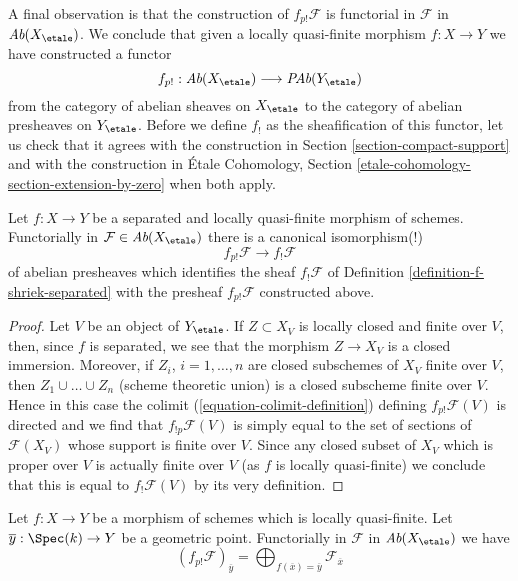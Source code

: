 \medskip\noindent
A final observation is that the construction of $f_{p!}\mathcal{F}$
is functorial in $\mathcal{F}$ in $\textit{Ab}(X_\etale)$.
We conclude that given a locally quasi-finite morphism $f : X \to Y$
we have constructed a functor
$$
f_{p!} :
\textit{Ab}(X_\etale)
\longrightarrow
\textit{PAb}(Y_\etale)
$$
from the category of abelian sheaves on $X_\etale$ to the category
of abelian presheaves on $Y_\etale$. Before we define $f_!$ as the
sheafification of this functor, let us check that it agrees with
the construction in Section \ref{section-compact-support}
and with the construction in
\'Etale Cohomology, Section \ref{etale-cohomology-section-extension-by-zero}
when both apply.

\begin{lemma}
\label{lemma-finite-support-f-shriek-separated}
Let $f : X \to Y$ be a separated and locally quasi-finite morphism
of schemes. Functorially in $\mathcal{F} \in \textit{Ab}(X_\etale)$
there is a canonical isomorphism(!)
$$
f_{p!}\mathcal{F} \longrightarrow f_!\mathcal{F}
$$
of abelian presheaves which identifies the sheaf
$f_!\mathcal{F}$ of Definition \ref{definition-f-shriek-separated}
with the presheaf $f_{p!}\mathcal{F}$ constructed above.
\end{lemma}

\begin{proof}
Let $V$ be an object of $Y_\etale$. If $Z \subset X_V$ is locally closed
and finite over $V$, then, since $f$ is separated, we see that
the morphism $Z \to X_V$ is a closed immersion. Moreover, if
$Z_i$, $i = 1, \ldots, n$ are closed subschemes of $X_V$ finite
over $V$, then $Z_1 \cup \ldots \cup Z_n$ (scheme theoretic union)
is a closed subscheme finite over $V$. Hence in this case the colimit
(\ref{equation-colimit-definition}) defining $f_{p!}\mathcal{F}(V)$
is directed and we find that $f_{!p}\mathcal{F}(V)$ is simply equal
to the set of sections of $\mathcal{F}(X_V)$ whose support is finite over $V$.
Since any closed subset of $X_V$ which is proper over $V$ is
actually finite over $V$ (as $f$ is locally quasi-finite)
we conclude that this is equal to $f_!\mathcal{F}(V)$
by its very definition.
\end{proof}

\begin{lemma}
\label{lemma-finite-support-stalk}
Let $f : X \to Y$ be a morphism of schemes which is locally quasi-finite.
Let $\overline{y} : \Spec(k) \to Y$ be a geometric point.
Functorially in $\mathcal{F}$ in $\textit{Ab}(X_\etale)$ we have
$$
(f_{p!}\mathcal{F})_{\overline{y}} =
\bigoplus\nolimits_{f(\overline{x}) = \overline{y}} \mathcal{F}_{\overline{x}}
$$
\end{lemma}

